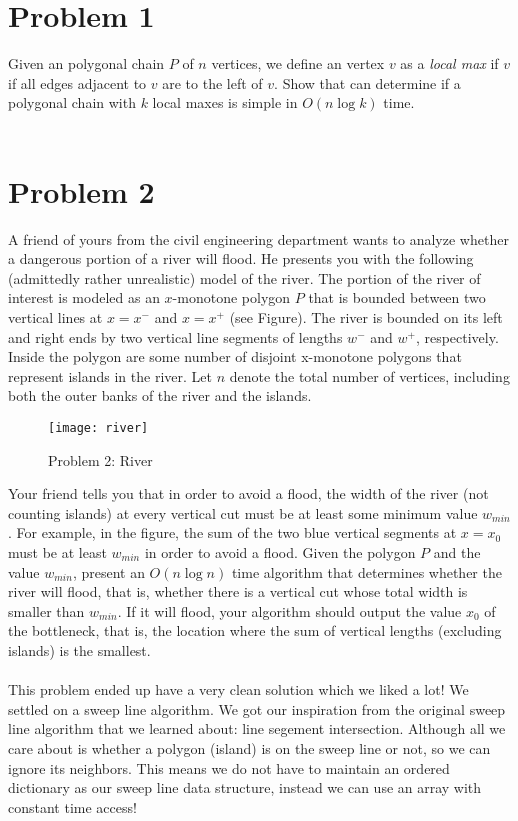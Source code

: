 \documentclass[11pt]{article}
\begin{document}

\newpage
\section*{Problem 1}

Given an polygonal chain $P$ of $n$ vertices, we define an vertex $v$ as a
\emph{local max} if $v$ if all edges adjacent to $v$ are to the left of $v$.
Show that can determine if a polygonal chain with $k$ local maxes is simple in
$O(n \log k)$ time. \\\\
\answer

\newpage
\section*{Problem 2}

A friend of yours from the civil engineering department wants to analyze whether
a dangerous portion of a river will flood. He presents you with the following
(admittedly rather unrealistic) model of the river. The portion of the river of
interest is modeled as an $x$-monotone polygon $P$ that is bounded between two
vertical lines at $x = x^-$ and $x = x^+$ (see Figure). The river is bounded on
its left and right ends by two vertical line segments of lengths $w^-$ and
$w^+$, respectively. Inside the polygon are some number of disjoint x-monotone
polygons that represent islands in the river.  Let $n$ denote the total number
of vertices, including both the outer banks of the river and the islands.

\begin{figure}[h]
    \centering
    \texttt{[image: river]}
    \caption{Problem 2: River}
\end{figure}

Your friend tells you that in order to avoid a flood, the width of the river
(not counting islands) at every vertical cut must be at least some minimum value
$w_{min}$. For example, in the figure, the sum of the two blue vertical segments
at $x = x_0$ must be at least $w_{min}$ in order to avoid a flood.  Given the
polygon $P$ and the value $w_{min}$, present an $O(n \log n)$ time algorithm that
determines whether the river will flood, that is, whether there is a vertical
cut whose total width is smaller than $w_{min}$. If it will flood, your algorithm
should output the value $x_0$ of the bottleneck, that is, the location where the
sum of vertical lengths (excluding islands) is the smallest. \\\\
\answer
This problem ended up have a very clean solution which we liked a lot!
We settled on a sweep line algorithm.
We got our inspiration from the original sweep line algorithm that we learned about: line segement intersection.
Although all we care about is whether a polygon (island) is on the sweep line or not, so we can ignore its neighbors.
This means we do not have to maintain an ordered dictionary as our sweep line data structure, instead we can use an array with constant time access!
\end{document}
